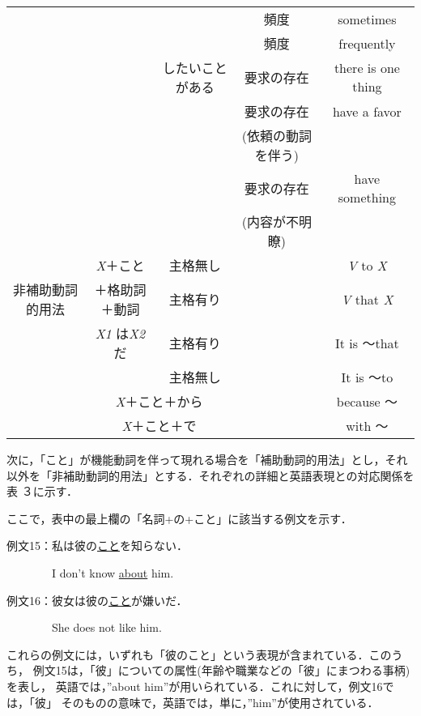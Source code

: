 \begin{table}[htbp]
\begin{center}
\begin{tabular}{|c|c|c|c|c|c|}
 & & \multicolumn{2}{|c|}{} & 頻度 & sometimes\\ \cline{5-6}
 & & \multicolumn{2}{|c|}{} & 頻度 & frequently\\ \cline{3-6}
 & & \multicolumn{2}{|c|}{したいことがある} & 要求の存在 & there is one
 thing\\ \cline{5-6}
 & & \multicolumn{2}{|c|}{} & 要求の存在 & have a favor\\
 & & \multicolumn{2}{|c|}{} & (依頼の動詞を伴う) & \\ \cline{5-6}
 & & \multicolumn{2}{|c|}{} & 要求の存在 & have something\\
 & & \multicolumn{2}{|c|}{} & (内容が不明瞭) & \\ \hline
 & \multicolumn{2}{|c|}{{\it X}＋こと} & 主格無し &  & {\it V} to {\it X}\\ \cline{4-4} \cline{6-6}
非補助動詞的用法 & \multicolumn{2}{|c|}{＋格助詞＋動詞} & 主格有り & &
 {\it V}
 that {\it X}\\ \cline{2-4} \cline{6-6}
 & \multicolumn{2}{|c|}{{\it X1} は{\it X2} だ} & 主格有り & & It is 〜that\\
 \cline{4-4} \cline{6-6}
 & \multicolumn{2}{|c|}{} & 主格無し & & It is 〜to\\ \cline{2-4} \cline{6-6}
 & \multicolumn{3}{|c|}{{\it X}＋こと＋から} & & because 〜\\ \cline{2-4} \cline{6-6}
 & \multicolumn{3}{|c|}{{\it X}＋こと＋で} & & with 〜\\ \hline
\end{tabular}
\end{center}
\end{table}

次に，「こと」が機能動詞を伴って現れる場合を「補助動詞的用法」とし，それ
以外を「非補助動詞的用法」とする．それぞれの詳細と英語表現との対応関係を表
３に示す．

ここで，表中の最上欄の「名詞+の+こと」に該当する例文を示す．

\vspace{6pt}

例文15：私は彼の\underline{こと}を知らない．

　　　　I don't know \underline{about} him.

例文16：彼女は彼の\underline{こと}が嫌いだ．

　　　　She does not like him.

\vspace{6pt}

これらの例文には，いずれも「彼のこと」という表現が含まれている．このうち，
例文15は，「彼」についての属性(年齢や職業などの「彼」にまつわる事柄)を表し，
英語では，''about him''が用いられている．これに対して，例文16では，「彼」
そのものの意味で，英語では，単に，''him''が使用されている．

